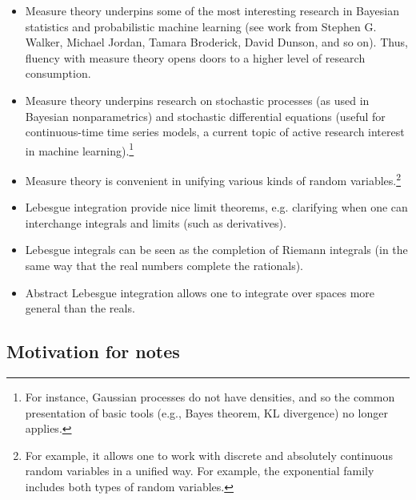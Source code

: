 \documentclass{article} %
\begin{document}
\begin{itemize}
\item Measure theory underpins some of the most interesting research in Bayesian statistics and probabilistic machine learning (see work from Stephen G. Walker, Michael Jordan, Tamara Broderick, David Dunson, and so on).   Thus, fluency with measure theory opens doors to a higher level of research consumption. 
\item Measure theory underpins research on stochastic processes (as used in Bayesian nonparametrics) and stochastic differential equations (useful for continuous-time time series models, a current topic of active research interest in machine learning).\footnote{For instance, Gaussian processes do not have densities, and so the common presentation of basic tools (e.g., Bayes theorem, KL divergence) no longer applies.} 
\item Measure theory is convenient in unifying various kinds of random variables.\footnote{For example, it allows one to work with discrete and absolutely continuous random variables in a unified way.  For example, the exponential family includes both types of random variables.}
\item Lebesgue integration provide nice limit theorems, e.g. clarifying when one can interchange integrals and limits (such as derivatives).   
\item Lebesgue integrals can be seen as the completion of Riemann integrals (in the same way that the real numbers complete the rationals).
\item Abstract Lebesgue integration allows one to integrate over spaces more general than the reals. 

\end{itemize}



\subsection{Motivation for notes}
\end{document}
